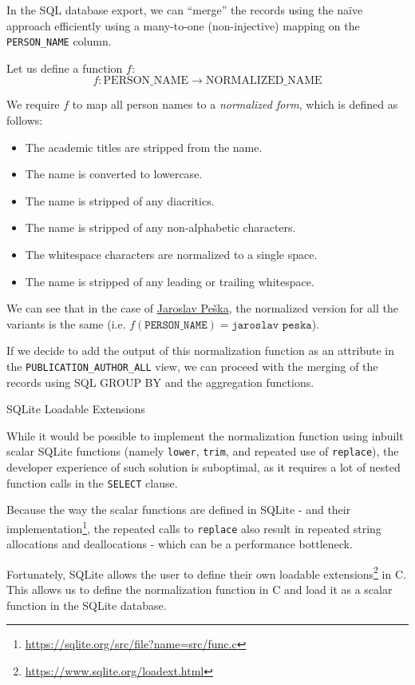 In the SQL database export, we can ``merge'' the records using the naïve approach efficiently using a many-to-one (non-injective) mapping
on the \texttt{PERSON\_NAME} column.

Let us define a function $f$:
$$f: \text{PERSON\_NAME} \to \text{NORMALIZED\_NAME}$$

We require $f$ to map all person names to a \textit{normalized form}, which is defined as follows:
\begin{itemize}
    \item The academic titles are stripped from the name.
    \item The name is converted to lowercase.
    \item The name is stripped of any diacritics.
    \item The name is stripped of any non-alphabetic characters.
    \item The whitespace characters are normalized to a single space.
    \item The name is stripped of any leading or trailing whitespace.
\end{itemize}

We can see that in the case of \hyperref[fig:jaroslav-peska]{Jaroslav Peška}, 
the normalized version for all the variants is the same (i.e. $f(\texttt{PERSON\_NAME}) = \texttt{jaroslav peska}$).

If we decide to add the output of this normalization function as an attribute in the \texttt{PUBLICATION\_AUTHOR\_ALL} view,
we can proceed with the merging of the records using SQL GROUP BY and the aggregation functions.

\begin{mybox}
    {SQLite Loadable Extensions}

    While it would be possible to implement the normalization function using inbuilt scalar SQLite functions (namely \texttt{lower}, \texttt{trim},
    and repeated use of \texttt{replace}), the developer experience of such solution is suboptimal, as it requires a lot of nested function calls
    in the \texttt{SELECT} clause.

    Because the way the scalar functions are defined in SQLite - and their implementation\footnote{\url{https://sqlite.org/src/file?name=src/func.c}}, 
    the repeated calls to \texttt{replace} also result in repeated string allocations and deallocations - which can be a performance bottleneck.

    Fortunately, SQLite allows the user to define their own loadable extensions\footnote{\url{https://www.sqlite.org/loadext.html}} in C.
    This allows us to define the normalization function in C and load it as a scalar function in the SQLite database.
\end{mybox}

